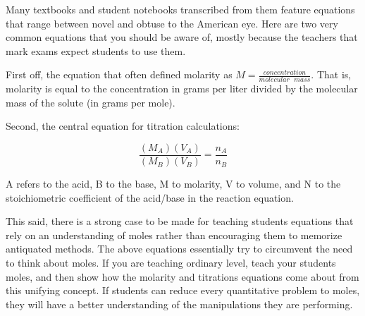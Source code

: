 Many textbooks and student notebooks transcribed from them feature equations that range between novel and obtuse to the American eye. Here are two very common equations that you should be aware of, mostly because the teachers that mark exams expect students to use them.

First off, the equation that often defined molarity as $M = \frac{concentration}{molecular\mbox{ }mass}$. That is, molarity is equal to the concentration in grams per liter divided by the molecular mass of the solute (in grams per mole).

Second, the central equation for titration calculations: 

\[ \frac{(M_A)(V_A)}{(M_B)(V_B)} = \frac{n_A}{n_B} \]

A refers to the acid, B to the base, M to molarity, V to volume, and N to the stoichiometric coefficient of the acid/base in the reaction equation.

This said, there is a strong case to be made for teaching students equations that rely on an understanding of moles rather than encouraging them to memorize antiquated methods. The above equations essentially try to circumvent the need to think about moles. If you are teaching ordinary level, teach your students moles, and then show how the molarity and titrations equations come about from this unifying concept. If students can reduce every quantitative problem to moles, they will have a better understanding of the manipulations they are performing.
